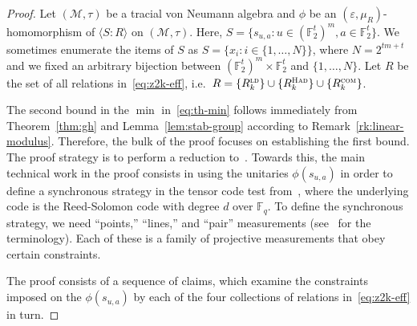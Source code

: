 \documentclass[11pt]{article}
\newtheorem{claim}[theorem]{Claim}
\theoremstyle{definition}
\DeclareMathOperator*{\Expectation}{\mathbb{E}}
\newcommand{\Es}[1]{\Expectation_{#1}}
\newcommand{\F}{\ensuremath{\mathbb{F}}}
\newcommand{\ld}{\textsc{ld}}
\newcommand{\com}{\textsc{com}}
\newcommand{\sq}{\textsc{sq}}
\newcommand{\mM}{\ensuremath{\mathcal{M}}}
\newcommand{\had}{\textsc{Had}}
\newcommand{\eps}{\varepsilon}
\begin{document}
\begin{proof}
Let $(\mM,\tau)$ be a tracial von Neumann algebra and $\phi$ be an $(\eps,\mu_R)$-homomorphism of $\langle S:R\rangle$ on $(\mM,\tau)$. 
 Here, $S = \{s_{u,a}: u\in (\F_2^t)^m, a\in \F_2^t\}$. We sometimes enumerate the items of $S$ as $S=\{x_i: i\in\{1,\ldots,N\}\}$, where $N=2^{tm+t}$ and we fixed an arbitrary bijection between $(\F_2^t)^m\times \F_2^t$ and $\{1,\ldots,N\}$. Let $R$ be the set of all relations in~\eqref{eq:z2k-eff}, i.e.\ $R=  \{R^\ld_k\}\cup\{R^\had_k\}\cup\{R^\com_k\}$. 

The second bound in the $\min$ in~\eqref{eq:th-min} follows immediately from Theorem~\ref{thm:gh} and Lemma~\ref{lem:stab-group} according to Remark~\ref{rk:linear-modulus}. Therefore, the bulk of the proof focuses on establishing the first bound. 
The proof strategy is to perform a reduction to~\cite[Theorem 4.1]{ji2022quantum}. Towards this, the main technical work in the proof consists in using the unitaries $\phi(s_{u,a})$ in order to define a synchronous strategy in the tensor code test from~\cite{ji2022quantum}, where the underlying code is the Reed-Solomon code with degree $d$ over $\F_q$. To define the synchronous strategy, we need ``points,'' ``lines,'' and ``pair'' measurements (see~\cite{ji2022quantum} for the terminology). Each of these is a family of projective measurements that obey certain constraints. 

The proof consists of a sequence of claims, which examine the constraints imposed on the $\phi(s_{u,a})$ by each of the four collections of relations in~\eqref{eq:z2k-eff} in turn.%



\end{proof}
\end{document}
